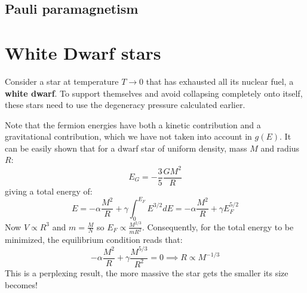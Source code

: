 \documentclass[a4paper,11pt,oneside]{book}
\begin{document}
\subsection{Pauli paramagnetism}

\section{White Dwarf stars}
Consider a star at temperature $T \rightarrow 0$ that has exhausted all its nuclear fuel, a \textbf{white dwarf}. To support themselves and avoid collapsing completely onto itself, these stars need to use the degeneracy pressure calculated earlier. 

Note that the fermion energies have both a kinetic contribution and a gravitational contribution, which we have not taken into account in $g(E)$. It can be easily shown that for a dwarf star of uniform density, mass $M$ and radius $R$:
\begin{equation}
    E_{G} = -\frac{3}{5}\frac{GM^2}{R}
\end{equation}
giving a total energy of:
\begin{equation}
    E = -\alpha \frac{M^2}{R}+\gamma \int_0^{E_F}E^{3/2} dE = -\alpha\frac{M^2}{R} + \gamma E_F^{5/2}
\end{equation}
Now $V \propto R^3$ and $m=\frac{M}{N}$ so $E_F \propto \frac{M^{2/3}}{mR^2}$. Consequently, for the total energy to be minimized, the equilibrium condition reads that:
\begin{equation}
    -\alpha \frac{M^2}{R} + \gamma \frac{M^{5/3}}{R^2} = 0 \implies R \propto M^{-1/3}
\end{equation}
This is a perplexing result, the more massive the star gets the smaller its size becomes!
\end{document}
